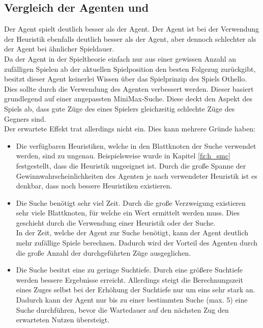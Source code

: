 \subsection{Vergleich der Agenten  und }
\label{subsec:Fazit:AgentenVgl}
Der  Agent spielt deutlich besser als der  Agent. Der  Agent ist bei der Verwendung der  Heuristik ebenfalls deutlich besser als der  Agent, aber dennoch schlechter als der  Agent bei ähnlicher Spieldauer.
\\Da der  Agent in der Spieltheorie einfach nur aus einer gewissen Anzahl an zufälligen Spielen ab der aktuellen Spielposition den besten Folgezug zurückgibt, besitzt dieser Agent keinerlei Wissen über das Spielprinzip des Spiels Othello. 
\\Dies sollte durch die Verwendung des  Agenten verbessert werden. Dieser basiert grundlegend auf einer angepassten MiniMax-Suche. Diese deckt den Aspekt des Spiels ab, dass gute Züge des eines Spielers gleichzeitig schlechte Züge des Gegners sind.
\\Der erwartete Effekt trat allerdings nicht ein. Dies kann mehrere Gründe haben:
\begin{itemize}
\item Die verfügbaren Heuristiken, welche in den Blattknoten der  Suche verwendet werden, sind zu ungenau. Beispielsweise wurde in Kapitel \ref{fz:h_smc} festgestellt, dass die Heuristik  ungeeignet ist. Durch die große Spanne der Gewinnwahrscheinlichkeiten des  Agenten je nach verwendeter Heuristik ist es denkbar, dass noch bessere Heuristiken existieren.
\item Die  Suche benötigt sehr viel Zeit. Durch die große Verzweigung existieren sehr viele Blattknoten, für welche ein Wert ermittelt werden muss. Dies geschieht durch die Verwendung einer Heuristik oder der  Suche.
\\In der Zeit, welche der  Agent zur Suche benötigt, kann der  Agent deutlich mehr zufällige Spiele berechnen. Dadurch wird der Vorteil des  Agenten durch die große Anzahl der durchgeführten Züge ausgeglichen.
\item Die  Suche besitzt eine zu geringe Suchtiefe. Durch eine größere Suchtiefe werden bessere Ergebnisse erreicht. Allerdings steigt die Berechnungszeit eines Zuges selbst bei der Erhöhung der Suchtiefe nur um eins sehr stark an. Dadurch kann der Agent nur bis zu einer bestimmten Suche (max. 5) eine  Suche durchführen, bevor die Wartedauer auf den nächsten Zug den erwarteten Nutzen übersteigt. 
\end{itemize} 
